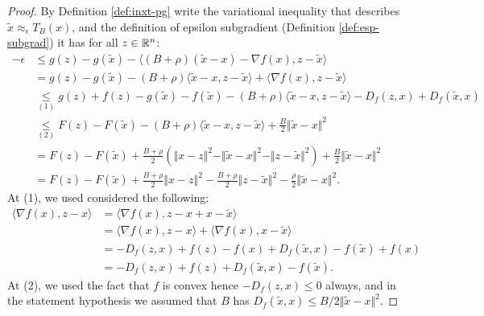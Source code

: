 \documentclass[12pt]{article}
\begin{document}
        \begin{proof}
            By Definition \ref{def:inxt-pg} write the variational inequality that describes $\tilde x \approx_\epsilon T_B(x)$, and the definition of epsilon subgradient (Definition \ref{def:esp-subgrad}) it has for all $z \in \mathbb R^n$: 
            \begin{align*}
                - \epsilon &\le 
                g(z) - g(\tilde x) - \langle (B + \rho)(\tilde x - x) - \nabla f(x), z - \tilde x\rangle
                \\
                &= 
                g(z) - g(\tilde x) 
                - (B + \rho)\langle \tilde x - x, z - \tilde x\rangle
                + \langle \nabla f(x), z - \tilde x\rangle
                \\
                &\underset{(1)}{\le} 
                g(z) + f(z) - g(\tilde x) - f(\tilde x)
                - (B + \rho)\langle \tilde x - x, z - \tilde x\rangle
                - D_f(z, x) + D_f(\tilde x, x)
                \\
                &\underset{(2)}{\le} 
                F(z) - F(\tilde x)
                - (B + \rho)\langle \tilde x - x, z - \tilde x\rangle
                + \frac{B}{2}\Vert \tilde x - x\Vert^2
                \\
                &=
                F(z) - F(\tilde x) + \frac{B + \rho}{2}\left(
                    \Vert x - z\Vert^2
                    - \Vert \tilde x - x\Vert^2
                    - \Vert z - \tilde x\Vert^2
                \right)
                + \frac{B}{2}\Vert \tilde x - x\Vert^2
                \\
                &= 
                F(z) - F(\tilde x)
                + \frac{B + \rho}{2}\Vert x - z\Vert^2
                - \frac{B + \rho}{2}\Vert z - \tilde x\Vert^2
                - \frac{\rho}{2}\Vert \tilde x - x\Vert^2. 
            \end{align*}
            At (1), we used considered the following: 
            \begin{align*}
                \langle \nabla f(x), z - x\rangle &= \langle \nabla f(x), z - x + x - \tilde x\rangle
                \\
                &= \langle \nabla f(x), z - x\rangle + \langle \nabla f(x), x - \tilde x\rangle
                \\
                &= -D_f(z, x) + f(z) - f(x) + D_f(\tilde x, x) - f(\tilde x) + f(x)
                \\
                &= -D_f(z, x) + f(z) + D_f(\tilde x, x) - f(\tilde x). 
            \end{align*}
            At (2), we used the fact that $f$ is convex hence $- D_f(z, x) \le 0$ always, and in the statement hypothesis we assumed that $B$ has $D_f(\tilde x, x) \le B/2\Vert \tilde x - x\Vert^2$. 
        \end{proof}
\end{document}
